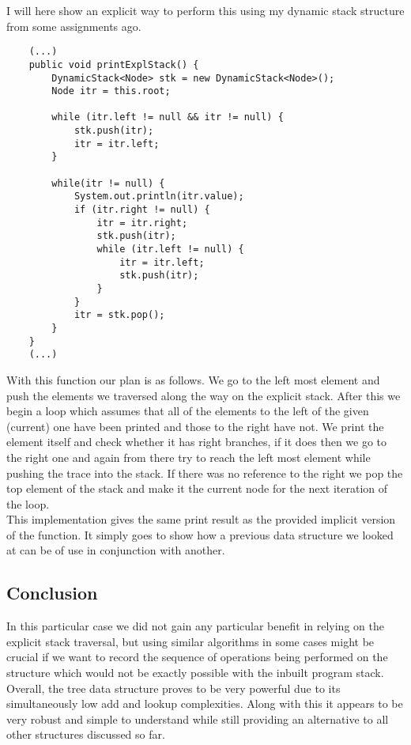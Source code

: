 \documentclass[a4paper,11pt]{article}
\begin{document}
I will here show an explicit way to perform this using my dynamic stack structure from some assignments ago.

\begin{verbatim}
    (...)
    public void printExplStack() {
        DynamicStack<Node> stk = new DynamicStack<Node>();
        Node itr = this.root;
        
        while (itr.left != null && itr != null) {
            stk.push(itr);
            itr = itr.left;
        }

        while(itr != null) {
            System.out.println(itr.value);
            if (itr.right != null) {
                itr = itr.right;
                stk.push(itr);
                while (itr.left != null) {
                    itr = itr.left;
                    stk.push(itr);
                }
            }
            itr = stk.pop();
        }
    }
    (...)
\end{verbatim}

With this function our plan is as follows. We go to the left most element and push the elements we traversed along the way on the explicit stack. After this we begin a loop which assumes that all of the elements to the left of the given (current) one have been printed and those to the right have not. We print the element itself and check whether it has right branches, if it does then we go to the right one and again from there try to reach the left most element while pushing the trace into the stack. If there was no reference to the right we pop the top element of the stack and make it the current node for the next iteration of the loop. 
\\

This implementation gives the same print result as the provided implicit version of the function. It simply goes to show how a previous data structure we looked at can be of use in conjunction with another.

\subsection*{Conclusion}

In this particular case we did not gain any particular benefit in relying on the explicit stack traversal, but using similar algorithms in some cases might be crucial if we want to record the sequence of operations being performed on the structure which would not be exactly possible with the inbuilt program stack. 
\\

Overall, the tree data structure proves to be very powerful due to its simultaneously low add and lookup complexities. Along with this it appears to be very robust and simple to understand while still providing an alternative to all other structures discussed so far.
\end{document}
